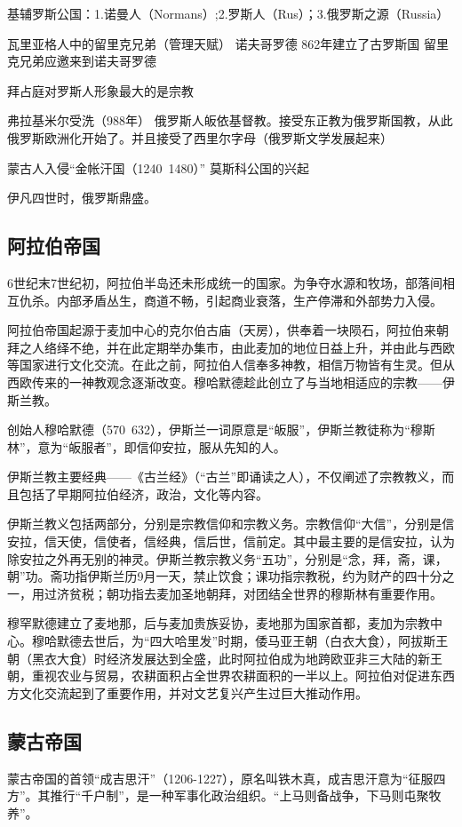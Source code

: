 基辅罗斯公国：1.诺曼人（Normans）;2.罗斯人（Rus）；3.俄罗斯之源（Russia）

瓦里亚格人中的留里克兄弟（管理天赋）
诺夫哥罗德 862年建立了古罗斯国
留里克兄弟应邀来到诺夫哥罗德

拜占庭对罗斯人形象最大的是宗教

弗拉基米尔受洗（988年） 俄罗斯人皈依基督教。接受东正教为俄罗斯国教，从此俄罗斯欧洲化开始了。并且接受了西里尔字母（俄罗斯文学发展起来）

蒙古人入侵“金帐汗国（1240~1480）” 莫斯科公国的兴起

伊凡四世时，俄罗斯鼎盛。

\subsection{阿拉伯帝国}
6世纪末7世纪初，阿拉伯半岛还未形成统一的国家。为争夺水源和牧场，部落间相互仇杀。内部矛盾丛生，商道不畅，引起商业衰落，生产停滞和外部势力入侵。

阿拉伯帝国起源于麦加中心的克尔伯古庙（天房），供奉着一块陨石，阿拉伯来朝拜之人络绎不绝，并在此定期举办集市，由此麦加的地位日益上升，并由此与西欧等国家进行文化交流。在此之前，阿拉伯人信奉多神教，相信万物皆有生灵。但从西欧传来的一神教观念逐渐改变。穆哈默德趁此创立了与当地相适应的宗教——伊斯兰教。

创始人穆哈默德（570~632），伊斯兰一词原意是“皈服”，伊斯兰教徒称为“穆斯林”，意为“皈服者”，即信仰安拉，服从先知的人。

伊斯兰教主要经典——《古兰经》（“古兰”即诵读之人），不仅阐述了宗教教义，而且包括了早期阿拉伯经济，政治，文化等内容。

伊斯兰教义包括两部分，分别是宗教信仰和宗教义务。宗教信仰“大信”，分别是信安拉，信天使，信使者，信经典，信后世，信前定。其中最主要的是信安拉，认为除安拉之外再无别的神灵。伊斯兰教宗教义务“五功”，分别是“念，拜，斋，课，朝”功。斋功指伊斯兰历9月一天，禁止饮食；课功指宗教税，约为财产的四十分之一，用过济贫税；朝功指去麦加圣地朝拜，对团结全世界的穆斯林有重要作用。

穆罕默德建立了麦地那，后与麦加贵族妥协，麦地那为国家首都，麦加为宗教中心。穆哈默德去世后，为“四大哈里发”时期，倭马亚王朝（白衣大食），阿拔斯王朝（黑衣大食）时经济发展达到全盛，此时阿拉伯成为地跨欧亚非三大陆的新王朝，重视农业与贸易，农耕面积占全世界农耕面积的一半以上。阿拉伯对促进东西方文化交流起到了重要作用，并对文艺复兴产生过巨大推动作用。

\subsection{蒙古帝国}
蒙古帝国的首领“成吉思汗”（1206-1227），原名叫铁木真，成吉思汗意为“征服四方”。其推行“千户制”，是一种军事化政治组织。“上马则备战争，下马则屯聚牧养”。

